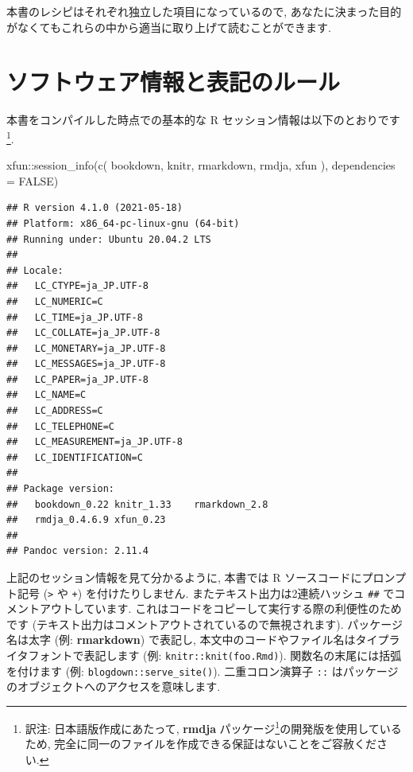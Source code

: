 \documentclass[
  11pt,
  lualatex,
  ja=standard]{bxjsreport}
\newenvironment{Shaded}{\begin{snugshade}}{\end{snugshade}}
\newcommand{\AttributeTok}[1]{\textcolor[rgb]{0.77,0.63,0.00}{#1}}
\newcommand{\ConstantTok}[1]{\textcolor[rgb]{0.00,0.00,0.00}{#1}}
\newcommand{\FunctionTok}[1]{\textcolor[rgb]{0.00,0.00,0.00}{#1}}
\newcommand{\NormalTok}[1]{#1}
\newcommand{\SpecialCharTok}[1]{\textcolor[rgb]{0.00,0.00,0.00}{#1}}
\newcommand{\StringTok}[1]{\textcolor[rgb]{0.31,0.60,0.02}{#1}}
\renewcommand{\href}[2]{#2\footnote{\url{#1}}}
\begin{document}
本書のレシピはそれぞれ独立した項目になっているので, あなたに決まった目的がなくてもこれらの中から適当に取り上げて読むことができます.

\hypertarget{software-info}{%
\section*{ソフトウェア情報と表記のルール}\label{software-info}}

本書をコンパイルした時点での基本的な R セッション情報は以下のとおりです\footnote{訳注: 日本語版作成にあたって, \href{https://github.com/Gedevan-Aleksizde/rmdja}{\textbf{rmdja} パッケージ}の開発版を使用しているため, 完全に同一のファイルを作成できる保証はないことをご容赦ください.}.

\begin{Shaded}
\begin{Highlighting}[numbers=left,,]
\NormalTok{xfun}\SpecialCharTok{::}\FunctionTok{session\_info}\NormalTok{(}\FunctionTok{c}\NormalTok{(}
  \StringTok{\textquotesingle{}bookdown\textquotesingle{}}\NormalTok{, }\StringTok{\textquotesingle{}knitr\textquotesingle{}}\NormalTok{, }\StringTok{\textquotesingle{}rmarkdown\textquotesingle{}}\NormalTok{, }\StringTok{\textquotesingle{}rmdja\textquotesingle{}}\NormalTok{, }\StringTok{\textquotesingle{}xfun\textquotesingle{}}
\NormalTok{), }\AttributeTok{dependencies =} \ConstantTok{FALSE}\NormalTok{)}
\end{Highlighting}
\end{Shaded}

\begin{verbatim}
## R version 4.1.0 (2021-05-18)
## Platform: x86_64-pc-linux-gnu (64-bit)
## Running under: Ubuntu 20.04.2 LTS
## 
## Locale:
##   LC_CTYPE=ja_JP.UTF-8      
##   LC_NUMERIC=C              
##   LC_TIME=ja_JP.UTF-8       
##   LC_COLLATE=ja_JP.UTF-8    
##   LC_MONETARY=ja_JP.UTF-8   
##   LC_MESSAGES=ja_JP.UTF-8   
##   LC_PAPER=ja_JP.UTF-8      
##   LC_NAME=C                 
##   LC_ADDRESS=C              
##   LC_TELEPHONE=C            
##   LC_MEASUREMENT=ja_JP.UTF-8
##   LC_IDENTIFICATION=C       
## 
## Package version:
##   bookdown_0.22 knitr_1.33    rmarkdown_2.8
##   rmdja_0.4.6.9 xfun_0.23    
## 
## Pandoc version: 2.11.4
\end{verbatim}

上記のセッション情報を見て分かるように, 本書では R ソースコードにプロンプト記号 (\texttt{\textgreater{}} や \texttt{+}) を付けたりしません. またテキスト出力は2連続ハッシュ \texttt{\#\#} でコメントアウトしています. これはコードをコピーして実行する際の利便性のためです (テキスト出力はコメントアウトされているので無視されます). パッケージ名は太字 (例: \textbf{rmarkdown}) で表記し, 本文中のコードやファイル名はタイプライタフォントで表記します (例: \texttt{knitr::knit(\textquotesingle{}foo.Rmd\textquotesingle{})}). 関数名の末尾には括弧を付けます (例: \texttt{blogdown::serve\_site()}). 二重コロン演算子 \texttt{::} はパッケージのオブジェクトへのアクセスを意味します.
\end{document}
